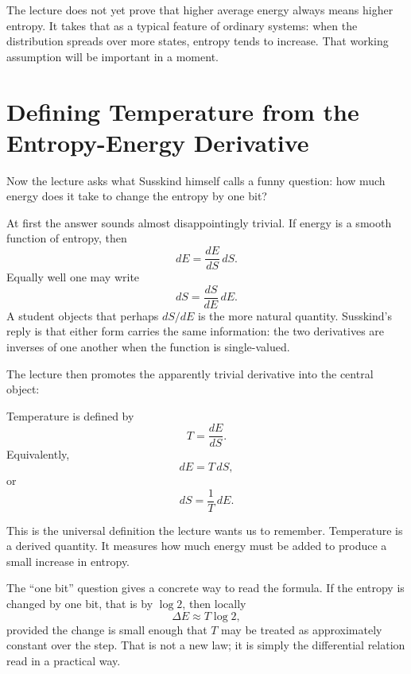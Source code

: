 The lecture does not yet prove that higher average energy always means higher entropy. It takes that as a typical feature of ordinary systems: when the distribution spreads over more states, entropy tends to increase. That working assumption will be important in a moment.

\section{Defining Temperature from the Entropy-Energy Derivative}

Now the lecture asks what Susskind himself calls a funny question: how much energy does it take to change the entropy by one bit?

At first the answer sounds almost disappointingly trivial. If energy is a smooth function of entropy, then
\begin{equation}
dE = \frac{dE}{dS}\, dS.
\end{equation}
Equally well one may write
\begin{equation}
dS = \frac{dS}{dE}\, dE.
\end{equation}
A student objects that perhaps \(dS/dE\) is the more natural quantity. Susskind's reply is that either form carries the same information: the two derivatives are inverses of one another when the function is single-valued.

The lecture then promotes the apparently trivial derivative into the central object:
\begin{definition}
Temperature is defined by
\begin{equation}
T = \frac{dE}{dS}.
\end{equation}
Equivalently,
\begin{equation}
dE = T\, dS,
\end{equation}
or
\begin{equation}
dS = \frac{1}{T}\, dE.
\end{equation}
\end{definition}

This is the universal definition the lecture wants us to remember. Temperature is a derived quantity. It measures how much energy must be added to produce a small increase in entropy.

The ``one bit'' question gives a concrete way to read the formula. If the entropy is changed by one bit, that is by \(\log 2\), then locally
\begin{equation}
\Delta E \approx T \log 2,
\end{equation}
provided the change is small enough that \(T\) may be treated as approximately constant over the step. That is not a new law; it is simply the differential relation read in a practical way.

